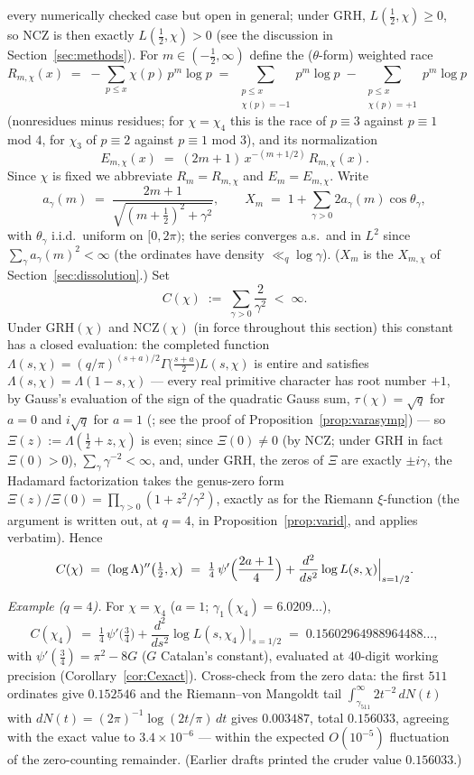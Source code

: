 every numerically checked case but open in general; under GRH,
$L(\tfrac12,\chi)\ge0$, so NCZ is then exactly $L(\tfrac12,\chi)>0$
(see the discussion in Section~\ref{sec:methods}). For
$m\in(-\tfrac12,\infty)$ define the ($\theta$-form) weighted race
\[
R_{m,\chi}(x)\;=\;-\sum_{p\le x}\chi(p)\,p^m\log p
\;=\;\sum_{\substack{p\le x\\ \chi(p)=-1}}p^m\log p
\;-\;\sum_{\substack{p\le x\\ \chi(p)=+1}}p^m\log p
\]
(nonresidues minus residues; for $\chi=\chi_4$ this is the race of
$p\equiv3$ against $p\equiv1$ mod $4$, for $\chi_3$ of $p\equiv2$
against $p\equiv1$ mod $3$), and its normalization
\[
E_{m,\chi}(x)\;=\;(2m+1)\,x^{-(m+1/2)}\,R_{m,\chi}(x).
\]
Since $\chi$ is fixed we abbreviate $R_m=R_{m,\chi}$ and
$E_m=E_{m,\chi}$. Write
\[
a_\gamma(m)\;=\;\frac{2m+1}{\sqrt{(m+\tfrac12)^2+\gamma^2}},
\qquad
X_m\;=\;1+\sum_{\gamma>0}2a_\gamma(m)\cos\theta_\gamma ,
\]
with $\theta_\gamma$ i.i.d.\ uniform on $[0,2\pi)$; the series converges
a.s.\ and in $L^2$ since $\sum_\gamma a_\gamma(m)^2<\infty$ (the
ordinates have density $\ll_q\log\gamma$). ($X_m$ is the $X_{m,\chi}$
of Section~\ref{sec:dissolution}.) Set
\[
C(\chi)\;:=\;\sum_{\gamma>0}\frac{2}{\gamma^2}\;<\;\infty .
\]
Under GRH$(\chi)$ and NCZ$(\chi)$ (in force throughout this section)
this constant has a closed evaluation: the completed function
$\Lambda(s,\chi)=(q/\pi)^{(s+a)/2}\Gamma\bigl(\tfrac{s+a}{2}\bigr)
L(s,\chi)$
is entire and satisfies $\Lambda(s,\chi)=\Lambda(1-s,\chi)$ --- every
real primitive character has root number $+1$, by Gauss's evaluation
of the sign of the quadratic Gauss sum, $\tau(\chi)=\sqrt q$ for
$a=0$ and $i\sqrt q$ for $a=1$ (\cite[Chs.~2, 9]{Dav00}; see the proof
of Proposition~\ref{prop:varasymp}) --- so
$\Xi(z):=\Lambda(\tfrac12+z,\chi)$ is even; since $\Xi(0)\ne0$ (by
NCZ; under GRH in fact $\Xi(0)>0$),
$\sum_\gamma\gamma^{-2}<\infty$,
and, under GRH, the zeros of $\Xi$ are exactly $\pm i\gamma$, the
Hadamard factorization takes the genus-zero form
$\Xi(z)/\Xi(0)=\prod_{\gamma>0}(1+z^2/\gamma^2)$, exactly as for the
Riemann $\xi$-function \cite[\S12]{Dav00} (the argument is written
out, at $q=4$, in Proposition~\ref{prop:varid}, and applies verbatim).
Hence
\[
C(\chi)\;=\;(\log\Lambda)''\bigl(\tfrac12,\chi\bigr)
\;=\;\tfrac14\,\psi'\Bigl(\frac{2a+1}{4}\Bigr)
+\frac{d^2}{ds^2}\log L(s,\chi)\Big|_{s=1/2}.
\]

\medskip\noindent\emph{Example ($q=4$).} For $\chi=\chi_4$ ($a=1$;
$\gamma_1(\chi_4)=6.0209\ldots$),
\[
C(\chi_4)\;=\;\tfrac14\,\psi'\bigl(\tfrac34\bigr)
+\frac{d^2}{ds^2}\log L(s,\chi_4)\Big|_{s=1/2}
\;=\;0.15602964988964488\ldots,
\]
with $\psi'(\tfrac34)=\pi^2-8G$ ($G$ Catalan's constant), evaluated at
$40$-digit working precision (Corollary~\ref{cor:Cexact}). Cross-check
from the zero data: the first
$511$ ordinates give $0.152546$ and the Riemann--von Mangoldt tail
$\int_{\gamma_{511}}^\infty 2t^{-2}\,dN(t)$ with
$dN(t)=(2\pi)^{-1}\log(2t/\pi)\,dt$ gives $0.003487$, total $0.156033$,
agreeing with the exact value to $3.4\times10^{-6}$ --- within the
expected $O(10^{-5})$ fluctuation of the zero-counting remainder.
(Earlier drafts printed the cruder value $0.156033$.)


